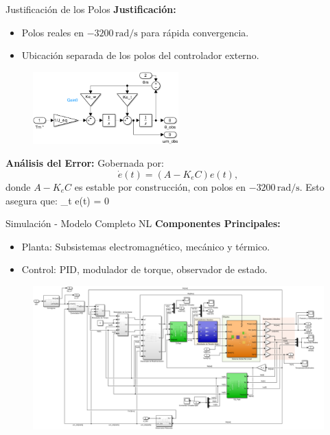 \documentclass[12pt]{beamer}
\begin{document}
\begin{frame}{Justificación de los Polos}\small
   \textbf{Justificación:}
\begin{itemize}
    \item Polos reales en \(-3200 \, \text{rad/s}\) para rápida convergencia.
    \item Ubicación separada de los polos del controlador externo.
\end{itemize}

\begin{figure}[h]
    \centering
    \includegraphics[width=0.5\textwidth]{Imagenes/observador.png}
\end{figure} 

\textbf{Análisis del Error:}
Gobernada por:
\[
\dot{e}(t) = (A - K_e C) e(t),
\]
donde \( A - K_e C \) es estable por construcción, con polos en \(-3200 \, \text{rad/s}\). Esto asegura que: \lim_{t \to \infty} e(t) = 0
\end{frame}

\begin{frame}{Simulación - Modelo Completo NL}\small
\textbf{Componentes Principales:}
\begin{itemize}
    \item Planta: Subsistemas electromagnético, mecánico y térmico.
    \item Control: PID, modulador de torque, observador de estado.
\end{itemize}

\begin{figure}[h]
    \centering
    \includegraphics[width=1\textwidth]{Imagenes/Modelo_Completo_Simulacion.png}
\end{figure}
\end{frame}
\end{document}
